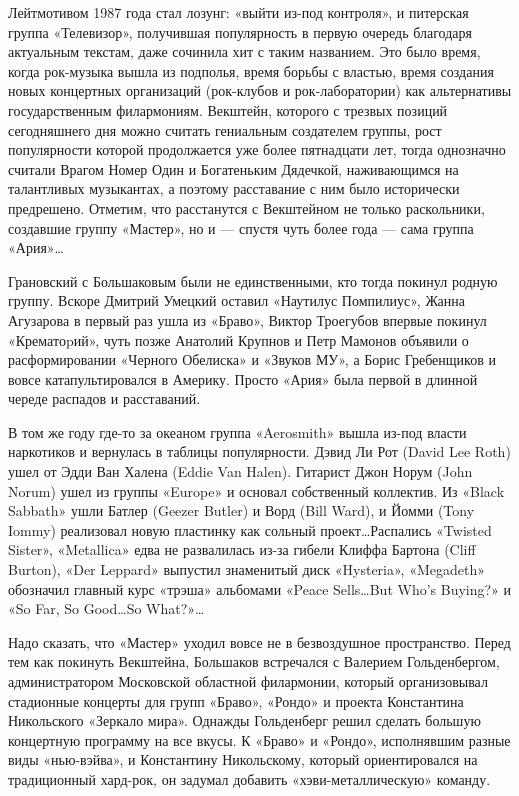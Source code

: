 \documentclass[16pt,a5paper]{book}
\begin{document}
Лейтмотивом 1987 года стал лозунг: «выйти из-под контроля», и питерская группа «Телевизор», получившая популярность в
первую очередь благодаря актуальным текстам, даже сочинила хит с таким названием. Это было время, когда рок-музыка вышла
из подполья, время борьбы с властью, время создания новых концертных организаций (рок-клубов и рок-лаборатории) как
альтернативы государственным филармониям. Векштейн, которого с трезвых позиций сегодняшнего дня можно считать гениальным
создателем группы, рост популярности которой продолжается уже более пятнадцати лет, тогда однозначно считали Врагом
Номер Один и Богатеньким Дядечкой, наживающимся на талантливых музыкантах, а поэтому расставание с ним было исторически
предрешено. Отметим, что расстанутся с Векштейном не только раскольники, создавшие группу «Мастер», но и — спустя чуть
более года — сама группа «Ария»\ldots

Грановский с Большаковым были не единственными, кто тогда покинул родную группу. Вскоре Дмитрий Умецкий оставил
«Наутилус Помпилиус», Жанна Агузарова в первый раз ушла из «Браво», Виктор Троегубов впервые покинул «Крематоpий», чуть
позже Анатолий Крупнов и Петр Мамонов объявили о расформировании «Черного Обелиска» и «Звуков МУ», а Борис Гребенщиков и
вовсе катапультировался в Америку. Просто «Ария» была первой в длинной череде распадов и расставаний.

В том же году где-то за океаном группа «Aerosmith» вышла из-под власти наркотиков и вернулась в таблицы популярности.
Дэвид Ли Рот (David Lee Roth) ушел от Эдди Ван Халена (Eddie Van Halen). Гитарист Джон Норум (John Norum) ушел из группы
«Europe» и основал собственный коллектив. Из «Black Sabbath» ушли Батлер (Geezer Butler) и Ворд (Bill Ward), и Йомми
(Tony Iommy) реализовал новую пластинку как сольный проект\ldots Распались «Twisted Sister», «Metallica» едва не
развалилась из-за гибели Клиффа Бартона (Cliff Burton), «Der Leppard» выпустил знаменитый диск «Hysteria», «Megadeth»
обозначил главный курс «трэша» альбомами «Peace Sells\ldots But Who's Buying?» и «So Far, So Good\ldots So What?»\ldots

Надо сказать, что «Мастер» уходил вовсе не в безвоздушное пространство. Перед тем как покинуть Векштейна, Большаков
встречался с Валерием Гольденбергом, администратором Московской областной филармонии, который организовывал стадионные
концерты для групп «Браво», «Рондо» и проекта Константина Никольского «Зеркало мира». Однажды Гольденберг решил сделать
большую концертную программу на все вкусы. К «Браво» и «Рондо», исполнявшим разные виды «нью-вэйва», и Константину
Никольскому, который ориентировался на традиционный хард-рок, он задумал добавить «хэви-металлическую» команду.
\end{document}
